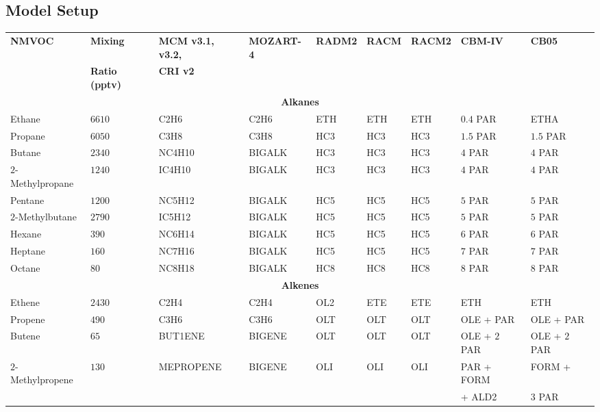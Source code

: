 \subsection{Model Setup} \label{ss:model_setup}

\begin{sidewaystable}
    \centering
    \begin{tabular}{lllllllll}
        \hline \hline
        \multirow{2}{*}{\textbf{NMVOC}} & \textbf{Mixing} & \textbf{MCM v3.1, v3.2,} & \multirow{2}{*}{\textbf{MOZART-4}} & \multirow{2}{*}{\textbf{RADM2}} & \multirow{2}{*}{\textbf{RACM}} & \multirow{2}{*}{\textbf{RACM2}} & \multirow{2}{*}{\textbf{CBM-IV}} & \multirow{2}{*}{\textbf{CB05}}\\ & \textbf{Ratio (pptv)} & \textbf{CRI v2} & & & & & & \\ 
        \hline \hline \multicolumn{9}{c}{\textbf{Alkanes}}  \\ \hline
        Ethane & $6610$ & C2H6 & C2H6 & ETH & ETH & ETH & $0.4$ PAR & ETHA \\
        Propane  & $6050$ & C3H8 & C3H8 & HC3 & HC3 & HC3 & $1.5$ PAR & $1.5$ PAR \\
        Butane & $2340$ & NC4H10 & BIGALK & HC3 & HC3 & HC3 & $4$ PAR & $4$ PAR \\
        $2$-Methylpropane & $1240$ & IC4H10 & BIGALK & HC3 & HC3 & HC3 & $4$ PAR & $4$ PAR \\
        Pentane & $1200$ & NC5H12 & BIGALK & HC5 & HC5 & HC5 & $5$ PAR & $5$ PAR \\
        $2$-Methylbutane & $2790$ & IC5H12 & BIGALK & HC5 & HC5 & HC5 & $5$ PAR & $5$ PAR \\
        Hexane & $390$ & NC6H14 & BIGALK & HC5 & HC5 & HC5 & $6$ PAR & $6$ PAR \\
        Heptane & $160$ & NC7H16 &  BIGALK & HC5 & HC5 & HC5 & $7$ PAR & $7$ PAR \\
        Octane & $80$ & NC8H18 & BIGALK & HC8 & HC8 & HC8 & $8$ PAR & $8$ PAR \\ \hline 
        \multicolumn{9}{c}{\textbf{Alkenes}} \\ \hline
        Ethene & $2430$ & C2H4 & C2H4 & OL2 & ETE & ETE & ETH & ETH \\
        Propene & $490$ & C3H6 & C3H6 & OLT & OLT & OLT & OLE + PAR & OLE + PAR \\ 
        Butene & $65$ & BUT1ENE & BIGENE & OLT & OLT & OLT & OLE + $2$ PAR & OLE + $2$ PAR \\ 
        \multirow{2}{*}{$2$-Methylpropene} & \multirow{2}{*}{$130$} & \multirow{2}{*}{MEPROPENE} & \multirow{2}{*}{BIGENE} & \multirow{2}{*}{OLI} & \multirow{2}{*}{OLI} & \multirow{2}{*}{OLI} & PAR + FORM & FORM + \\ & & & & & & & \hspace{3mm}+ ALD2 & \hspace{3mm}$3$ PAR \\

\end{tabular}
\end{sidewaystable}
